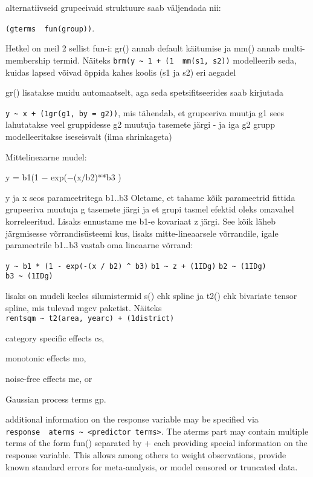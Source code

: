 \documentclass[]{article}
\begin{document}
alternatiivseid grupeeivaid struktuure saab väljendada nii:

\texttt{(gterms\ \textbar{}\ fun(group))}.

Hetkel on meil 2 sellist fun-i: gr() annab default käitumise ja mm()
annab multi-membership termid. Näiteks
\texttt{brm(y\ \textasciitilde{}\ 1\ +\ (1\ \textbar{}\ mm(s1,\ s2))}
modelleerib seda, kuidas lapsed võivad õppida kahes koolis (s1 ja s2)
eri aegadel

gr() lisatakse muidu automaatselt, aga seda spetsifitseerides saab
kirjutada

\texttt{y\ \textasciitilde{}\ x\ +\ (1\textbar{}gr(g1,\ by\ =\ g2))},
mis tähendab, et grupeeriva muutja g1 sees lahutatakse veel gruppidesse
g2 muutuja tasemete järgi - ja iga g2 grupp modelleeritakse iseseisvalt
(ilma shrinkageta)

Mittelineaarne mudel:

y = b1(1 − exp(−(x/b2)**b3 )

y ja x seos parameetritega b1..b3 Oletame, et tahame kõik parameetrid
fittida grupeeriva muutuja g tasemete järgi ja et grupi tasmel efektid
oleks omavahel korreleeritud. Lisaks ennustame me b1-e kovariaat z
järgi. See kõik läheb järgmisesse võrrandisüsteemi kus, lisaks
mitte-lineaarsele võrrandile, igale parameetrile b1\ldots{}b3 vastab oma
lineaarne võrrand:

\texttt{y\ \textasciitilde{}\ b1\ *\ (1\ -\ exp(-(x\ /\ b2)\ \^{}\ b3)}
\texttt{b1\ \textasciitilde{}\ z\ +\ (1\textbar{}ID\textbar{}g)}
\texttt{b2\ \textasciitilde{}\ (1\textbar{}ID\textbar{}g)}
\texttt{b3\ \textasciitilde{}\ (1\textbar{}ID\textbar{}g)}

lisaks on mudeli keeles silumistermid s() ehk spline ja t2() ehk
bivariate tensor spline, mis tulevad mgcv paketist. Näiteks
\texttt{rentsqm\ \textasciitilde{}\ t2(area,\ yearc)\ +\ (1\textbar{}district)}

category specific effects cs,

monotonic effects mo,

noise-free effects me, or

Gaussian process terms gp.

additional information on the response variable may be specified via
\texttt{response\ \textbar{}\ aterms\ \textasciitilde{}\ \textless{}predictor\ terms\textgreater{}}.
The aterms part may contain multiple terms of the form fun() separated
by + each providing special information on the response variable. This
allows among others to weight observations, provide known standard
errors for meta-analysis, or model censored or truncated data.
\end{document}
